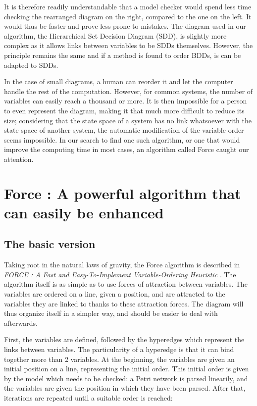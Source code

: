 \documentclass[12pt]{report}
\begin{document}
It is therefore readily understandable that a model checker would spend less time checking the rearranged diagram on the right, compared to the one on the left. It would thus be faster and prove less prone to mistakes. The diagram used in our algorithm, the Hierarchical Set Decision Diagram (SDD), is slightly more complex as it allows links between variables to be SDDs themselves. However, the principle remains the same and if a method is found to order BDDs, is can be adapted to SDDs.

In the case of small diagrams, a human can reorder it and let the computer handle the rest of the computation. However, for common systems, the number of variables can easily reach a thousand or more. It is then impossible for a person to even represent the diagram, making it that much more difficult to reduce its size; considering that the state space of a system has no link whatsoever with the state space of another system, the automatic modification of the variable order seems impossible. In our search to find one such algorithm, or one that would improve the computing time in most cases, an algorithm called Force caught our attention.

\chapter{Force : A powerful algorithm that can easily be enhanced}

\section{The basic version} \label{basic_force}

Taking root in the natural laws of gravity, the Force algorithm is described in \textit{FORCE : A Fast and Easy-To-Implement Variable-Ordering Heuristic} \cite{force}. The algorithm itself is as simple as to use forces of attraction between variables. The variables are ordered on a line, given a position, and are attracted to the variables they are linked to thanks to these attraction forces. The diagram will thus organize itself in a simpler way, and should be easier to deal with afterwards.

First, the variables are defined, followed by the hyperedges which represent the links between variables. The particularity of a hyperedge is that it can bind together more than 2 variables. At the beginning, the variables are given an initial position on a line, representing the initial order. This initial order is given by the model which needs to be checked: a Petri network is parsed linearily, and the variables are given the position in which they have been parsed. After that, iterations are repeated until a suitable order is reached:
\end{document}
